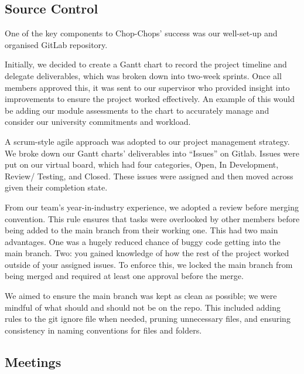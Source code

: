 \documentclass{article}
\begin{document}
    \subsection{Source Control}
    One of the key components to Chop-Chops’ success was our well-set-up and organised GitLab repository. 

    Initially, we decided to create a Gantt chart to record the project timeline and delegate deliverables, which was broken down into two-week sprints. Once all members approved this, it was sent to our supervisor who provided insight into improvements to ensure the project worked effectively. An example of this would be adding our module assessments to the chart to accurately manage and consider our university commitments and workload. 

    A scrum-style agile approach was adopted to our project management strategy. We broke down our Gantt charts’ deliverables into “Issues” on Gitlab. Issues were put on our virtual board, which had four categories, Open, In Development, Review/ Testing, and Closed. These issues were assigned and then moved across given their completion state. 

    From our team’s year-in-industry experience, we adopted a review before merging convention. This rule ensures that tasks were overlooked by other members before being added to the main branch from their working one. This had two main advantages. One was a hugely reduced chance of buggy code getting into the main branch. Two: you gained knowledge of how the rest of the project worked outside of your assigned issues. To enforce this, we locked the main branch from being merged and required at least one approval before the merge.

    We aimed to ensure the main branch was kept as clean as possible; we were mindful of what should and should not be on the repo. This included adding rules to the git ignore file when needed, pruning unnecessary files, and ensuring consistency in naming conventions for files and folders.

    \subsection{Meetings}
\end{document}
